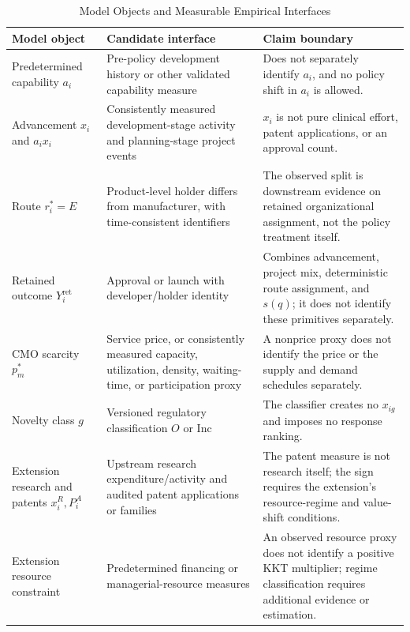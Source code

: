 \documentclass[12pt]{article}
\newcommand{\1}{\mathbf{1}}
\begin{document}
\begin{table}[htbp]
\centering
\footnotesize
\caption{Model Objects and Measurable Empirical Interfaces}
\label{tab:model_data_mapping}
\begin{tabularx}{\textwidth}{L{0.24\textwidth}Y Y}
\toprule
Model object & Candidate interface & Claim boundary \\
\midrule
Predetermined capability \(a_i\) & Pre-policy development history or other validated capability measure & Does not separately identify \(a_i\), and no policy shift in \(a_i\) is allowed. \\
Advancement \(x_i\) and \(a_ix_i\) & Consistently measured development-stage activity and planning-stage project events & \(x_i\) is not pure clinical effort, patent applications, or an approval count. \\
Route \(r_i^*=E\) & Product-level holder differs from manufacturer, with time-consistent identifiers & The observed split is downstream evidence on retained organizational assignment, not the policy treatment itself. \\
Retained outcome \(Y_i^{\mathrm{ret}}\) & Approval or launch with developer/holder identity & Combines advancement, project mix, deterministic route assignment, and \(s(q)\); it does not identify these primitives separately. \\
CMO scarcity \(p_m^*\) & Service price, or consistently measured capacity, utilization, density, waiting-time, or participation proxy & A nonprice proxy does not identify the price or the supply and demand schedules separately. \\
Novelty class \(g\) & Versioned regulatory classification \(O\) or \(\mathrm{Inc}\) & The classifier creates no \(x_{ig}\) and imposes no response ranking. \\
Extension research and patents \(x_i^R,P_i^A\) & Upstream research expenditure/activity and audited patent applications or families & The patent measure is not research itself; the sign requires the extension's resource-regime and value-shift conditions. \\
Extension resource constraint & Predetermined financing or managerial-resource measures & An observed resource proxy does not identify a positive KKT multiplier; regime classification requires additional evidence or estimation. \\
\bottomrule
\end{tabularx}
\end{table}
\end{document}
